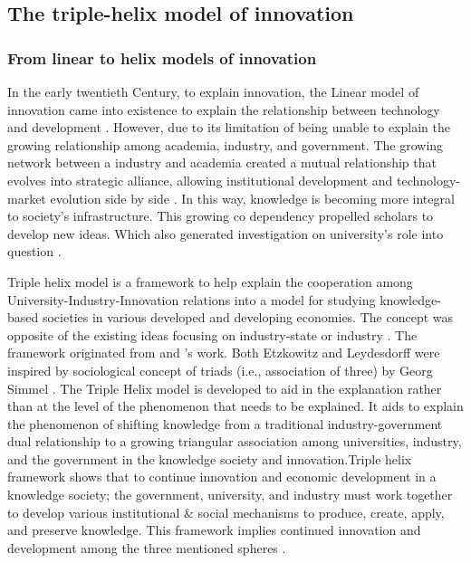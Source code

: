 \documentclass[CHICAGO,Times1COL]{WileyNJDv5} %
\begin{document}
 


\subsection{The triple-helix model of innovation}
\subsubsection{From linear to helix models of innovation}

In the early twentieth Century, to explain innovation, the Linear model of innovation came into existence to explain the relationship between technology and development \citet{Godin2006}. However, due to its limitation of being unable to explain the growing relationship among academia, industry, and government. The growing network between a industry and academia created a mutual relationship that evolves into strategic alliance, allowing institutional development and technology-market evolution side by side \citet[see][]{Nelson1994}. In this way, knowledge is becoming more integral to  society's infrastructure. This growing co dependency propelled scholars to develop new ideas. Which also generated investigation on university's role into question \citet{etzkowitz1995triple}.

Triple helix model is a framework to help explain the cooperation among University-Industry-Innovation relations into a model for studying knowledge-based societies in various developed and developing economies. The concept was opposite of the existing ideas focusing on industry-state or industry \citet{TheorizingtheTripleHelixmodelPastpresentandfuture}. The framework originated from \citet{Lowe1982} and \citet{etzkowitz1995triple}'s work. Both Etzkowitz and Leydesdorff were inspired by sociological concept of triads (i.e., association of three) by Georg Simmel \citep[see][]{SiltaloppiVargo2017,NOOTEBOOM_2006}. The Triple Helix model is developed to aid in the explanation rather than at the level of the phenomenon that needs to be explained. It aids to explain the phenomenon of shifting knowledge from a traditional industry-government dual relationship to a growing triangular association among universities, industry, and the government in the knowledge society and innovation.Triple helix framework shows that to continue innovation and economic development in a knowledge society; the government, university, and industry must work together to develop various institutional \& social mechanisms to produce, create, apply, and preserve knowledge. This framework implies continued innovation and development among the three mentioned spheres \citet{su10082646}.
\end{document}
